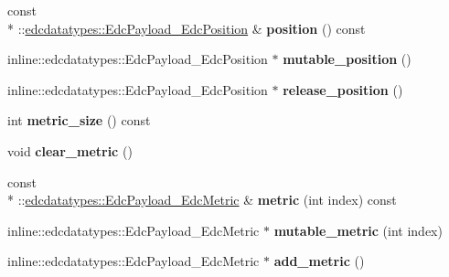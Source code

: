 \begin{DoxyCompactItemize}
\item 
\hypertarget{classedcdatatypes_1_1_edc_payload_a127ec745b6142f6ee60d55da0b0641a8}{const \\*
\-::\hyperlink{classedcdatatypes_1_1_edc_payload___edc_position}{edcdatatypes\-::\-Edc\-Payload\-\_\-\-Edc\-Position} \& {\bfseries position} () const }\label{classedcdatatypes_1_1_edc_payload_a127ec745b6142f6ee60d55da0b0641a8}

\item 
\hypertarget{classedcdatatypes_1_1_edc_payload_a71035f64b35e413e2f0158d8d96a8e2c}{inline\-::edcdatatypes\-::\-Edc\-Payload\-\_\-\-Edc\-Position $\ast$ {\bfseries mutable\-\_\-position} ()}\label{classedcdatatypes_1_1_edc_payload_a71035f64b35e413e2f0158d8d96a8e2c}

\item 
\hypertarget{classedcdatatypes_1_1_edc_payload_ab9720302d76c833ca6e28c5cc2b0af7d}{inline\-::edcdatatypes\-::\-Edc\-Payload\-\_\-\-Edc\-Position $\ast$ {\bfseries release\-\_\-position} ()}\label{classedcdatatypes_1_1_edc_payload_ab9720302d76c833ca6e28c5cc2b0af7d}

\item 
\hypertarget{classedcdatatypes_1_1_edc_payload_a7a9030145dde7354d6609262fd9da91e}{int {\bfseries metric\-\_\-size} () const }\label{classedcdatatypes_1_1_edc_payload_a7a9030145dde7354d6609262fd9da91e}

\item 
\hypertarget{classedcdatatypes_1_1_edc_payload_ab568ef909e56641818b093ff8c977c63}{void {\bfseries clear\-\_\-metric} ()}\label{classedcdatatypes_1_1_edc_payload_ab568ef909e56641818b093ff8c977c63}

\item 
\hypertarget{classedcdatatypes_1_1_edc_payload_af0254afd9a40dc40401c28bc062901c0}{const \\*
\-::\hyperlink{classedcdatatypes_1_1_edc_payload___edc_metric}{edcdatatypes\-::\-Edc\-Payload\-\_\-\-Edc\-Metric} \& {\bfseries metric} (int index) const }\label{classedcdatatypes_1_1_edc_payload_af0254afd9a40dc40401c28bc062901c0}

\item 
\hypertarget{classedcdatatypes_1_1_edc_payload_aeb9fcff3b2ab5aa392ed5689c4988d70}{inline\-::edcdatatypes\-::\-Edc\-Payload\-\_\-\-Edc\-Metric $\ast$ {\bfseries mutable\-\_\-metric} (int index)}\label{classedcdatatypes_1_1_edc_payload_aeb9fcff3b2ab5aa392ed5689c4988d70}

\item 
\hypertarget{classedcdatatypes_1_1_edc_payload_a582700b4b230b5f6887076a808600ca4}{inline\-::edcdatatypes\-::\-Edc\-Payload\-\_\-\-Edc\-Metric $\ast$ {\bfseries add\-\_\-metric} ()}\label{classedcdatatypes_1_1_edc_payload_a582700b4b230b5f6887076a808600ca4}


\end{DoxyCompactItemize}
